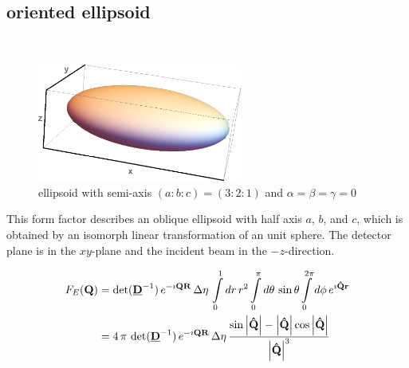\subsection{oriented ellipsoid} ~\\

\begin{figure}[htb]
\begin{center}
\includegraphics[width=0.6\textwidth]{../images/form_factor/supershapes/triaxial_ellipsoid321.png}
\end{center}
\caption{ellipsoid with semi-axis $(a:b:c)=(3:2:1)$ and $\alpha=\beta=\gamma=0$}
\label{fig:opo_ellipsoid}
\end{figure}

This form factor describes an oblique ellipsoid with half axis $a$, $b$, and $c$, which is obtained by an isomorph linear transformation of an unit sphere. The detector plane is in the $xy$-plane and the incident beam in the $-z$-direction.


\begin{align}
F_E(\B{Q}) &=
\det(\M{D}^{-1})\, e^{-\imath\B{QR}}\, \Delta\eta\, \int\limits_0^1
dr\, r^2 \int\limits_0^{\pi} d\theta\, \sin \theta \int\limits_0^{2\pi}
d\phi \, e^{\imath\B{\hat{Q}r}} \nonumber \\
&=
\displaystyle 4\, \pi\, \det(\M{D}^{-1})\, e^{-\imath\B{QR}}\,
\Delta\eta\, \frac{\sin \abs{\B{\hat{Q}}}-
\abs{\B{\hat{Q}}}\cos \abs{\B{\hat{Q}}}}{\abs{\B{\hat{Q}}}^3}
\label{eq:form:E}
\end{align}

